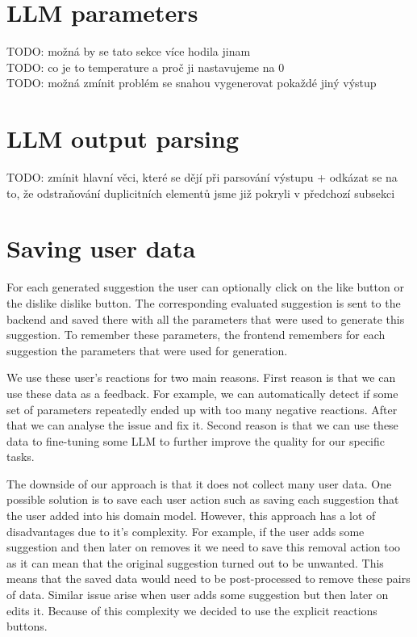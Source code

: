 \section{LLM parameters}

TODO: možná by se tato sekce více hodila jinam \\

TODO: co je to temperature a proč ji nastavujeme na 0 \\

TODO: možná zmínit problém se snahou vygenerovat pokaždé jiný výstup \\


\section{LLM output parsing}

TODO: zmínit hlavní věci, které se dějí při parsování výstupu + odkázat se na to, že odstraňování duplicitních elementů jsme již pokryli v předchozí subsekci \\


\section{Saving user data}

For each generated suggestion the user can optionally click on the like button or the dislike dislike button. The corresponding evaluated suggestion is sent to the backend and saved there with all the parameters that were used to generate this suggestion. To remember these parameters, the frontend remembers for each suggestion the parameters that were used for generation.

We use these user's reactions for two main reasons. First reason is that we can use these data as a feedback. For example, we can automatically detect if some set of parameters repeatedly ended up with too many negative reactions. After that we can analyse the issue and fix it. Second reason is that we can use these data to fine-tuning some LLM to further improve the quality for our specific tasks.

The downside of our approach is that it does not collect many user data. One possible solution is to save each user action such as saving each suggestion that the user added into his domain model. However, this approach has a lot of disadvantages due to it's complexity. For example, if the user adds some suggestion and then later on removes it we need to save this removal action too as it can mean that the original suggestion turned out to be unwanted. This means that the saved data would need to be post-processed to remove these pairs of data. Similar issue arise when user adds some suggestion but then later on edits it. Because of this complexity we decided to use the explicit reactions buttons.


